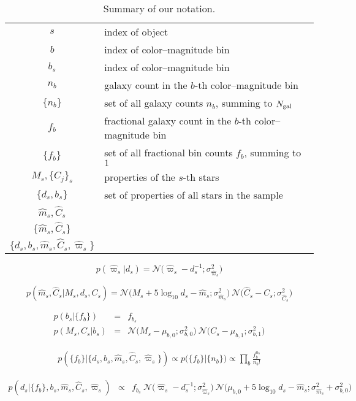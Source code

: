 \documentclass[aps,prd,showpacs,superscriptaddress,groupedaddress]{revtex4}  %
\newcommand{\equ}[1]{\begin{equation}#1\end{equation}}
\newcommand{\eqn}[1]{\begin{eqnarray}#1\end{eqnarray}}
\newcommand{\nobj}{{N_{\rm gal}}}
\begin{document}
\begin{table} %
\centering
\begin{tabular}{cl}
\hline
$s$	&	index of object \\
$b$	&	index of color--magnitude bin\\
$b_s$	&	index of color--magnitude bin\\
$n_b$	& 	galaxy count in the $b$-th color--magnitude bin  \\
$\{n_b\}$	&	set of all galaxy counts $n_b$, summing to $\nobj$\\
$f_b$	&	fractional galaxy count in the $b$-th color--magnitude bin  \\
$\{f_b\}$	&	set of all fractional bin counts $f_b$, summing to $1$\\
$M_s, \{C_j\}_s$	&	properties of the $s$-th stars	\\
$\{ d_s, b_s\}$	&	set of properties of all stars in the sample	\\
$\hat{m}_s, \hat{C}_s$ 	&	\\
$\{ \hat{m}_s, \hat{C}_s \}$ &	\\
$\{ d_s, b_s, \hat{m}_s, \hat{C}_s, \hat{\varpi}_s \}$	 	&	\\
\hline
\end{tabular}
\caption{Summary of our notation. }
\label{tab:notation}
\end{table} 



\equ{
	p\left(\hat{\varpi}_s \bigr\rvert d_s\right) = \mathcal{N}\bigl(\hat{\varpi}_s - d_s^{-1};\sigma_{\hat{\varpi}_s}^2 \bigr)
}

\equ{
	p\left(\hat{m}_s, \hat{C}_s \bigr\rvert M_s, d_s, C_s\right)  =  \mathcal{N}\bigl( M_s + 5\log_{10}d_s  -\hat{m}_s ;\sigma_{\hat{m}_s}^2 \bigr) \  \mathcal{N}\bigl(\hat{C}_s - C_s;\sigma_{\hat{C}_s}^2 \bigr)
}

\eqn{
	p\left(b_s \bigr\rvert \bigl\{ f_b \bigr\}\right) &=& f_{b_s} \\ 
	p\left(M_s, C_s \bigr\rvert b_s \right) &=& \mathcal{N}\bigl(M_s - \mu_{b,0};\sigma_{b,0}^2 \bigr)  \ \mathcal{N}\bigl(C_s - \mu_{b,1};\sigma_{b,1}^2 \bigr)
}


\eqn{
	p\left(\bigl\{ f_b \bigr\} \bigr\rvert \bigl\{ d_s, b_s, \hat{m}_s, \hat{C}_s, \hat{\varpi}_s \bigr\} \right) \propto p\bigl( \bigl\{ f_b \bigr\} \bigr\rvert \{n_b \} \bigr) \propto \prod_b \frac{ f_b^{n_b} }{n_b !}
}


\eqn{
	p\left(d_s \bigr\rvert \bigl\{ f_b \bigr\}, b_s, \hat{m}_s, \hat{C}_s, \hat{\varpi}_s\right) &\propto& f_{b_s} \ \mathcal{N}\bigl(\hat{\varpi}_s - d_s^{-1};\sigma_{\hat{\varpi}_s}^2 \bigr) \  \mathcal{N}\bigl( \mu_{b,0} + 5\log_{10}d_s  -\hat{m}_s ;\sigma_{\hat{m}_s}^2 + \sigma_{b,0}^2 \bigr) 
}
\end{document}
